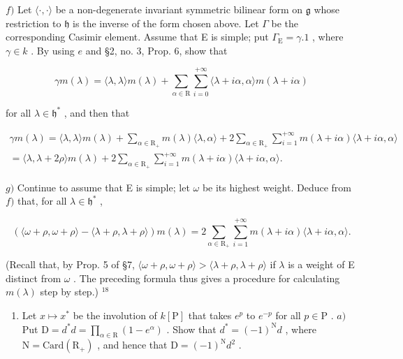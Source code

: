 \(f)\) Let \(\langle\cdot,\cdot\rangle\) be a non-degenerate invariant symmetric bilinear form on \(\mathfrak{g}\) whose restriction to \(\mathfrak{h}\) is the inverse of the form chosen above. Let \(\Gamma\) be the corresponding Casimir element. Assume that E is simple; put \(\Gamma_{\mathrm{E}}=\gamma.1\) , where \(\gamma\in k\) . By using \(e\) and §2, no. 3, Prop. 6, show that

\[
\gamma m (\lambda) = \langle \lambda , \lambda \rangle m (\lambda) + \sum_ {\alpha \in \mathrm{R}} \sum_ {i = 0} ^ {+ \infty} \langle \lambda + i \alpha , \alpha \rangle m (\lambda + i \alpha)
\]

for all \(\lambda \in \mathfrak{h}^*\) , and then that

\[
\begin{array}{l} \gamma m (\lambda) = \langle \lambda , \lambda \rangle m (\lambda) + \sum_ {\alpha \in \mathrm{R} _ {+}} m (\lambda) \langle \lambda , \alpha \rangle + 2 \sum_ {\alpha \in \mathrm{R} _ {+}} \sum_ {i = 1} ^ {+ \infty} m (\lambda + i \alpha) \langle \lambda + i \alpha , \alpha \rangle \\ = \langle \lambda , \lambda + 2 \rho \rangle m (\lambda) + 2 \sum_ {\alpha \in \mathrm{R} _ {+}} \sum_ {i = 1} ^ {+ \infty} m (\lambda + i \alpha) \langle \lambda + i \alpha , \alpha \rangle . \end{array}
\]

\(g)\) Continue to assume that E is simple; let \(\omega\) be its highest weight. Deduce from \(f)\) that, for all \(\lambda \in \mathfrak{h}^*\) ,

\[
(\langle \omega + \rho , \omega + \rho \rangle - \langle \lambda + \rho , \lambda + \rho \rangle) m (\lambda) = 2 \sum_ {\alpha \in \mathrm{R} _ {+}} \sum_ {i = 1} ^ {+ \infty} m (\lambda + i \alpha) \langle \lambda + i \alpha , \alpha \rangle .
\]

(Recall that, by Prop. 5 of §7, \(\langle\omega+\rho,\omega+\rho\rangle>\langle\lambda+\rho,\lambda+\rho\rangle\) if \(\lambda\) is a weight of E distinct from \(\omega\) . The preceding formula thus gives a procedure for calculating \(m(\lambda)\) step by step.) \(^{18}\)

\begin{enumerate}
\def\labelenumi{\arabic{enumi})}
\setcounter{enumi}{5}
\tightlist
\item
  Let \(x \mapsto x^*\) be the involution of \(k[\mathrm{P}]\) that takes \(e^p\) to \(e^{-p}\) for all \(p \in \mathrm{P}\) . \(a)\) Put \(\mathrm{D} = d^* d = \prod_{\alpha \in \mathrm{R}} (1 - e^\alpha)\) . Show that \(d^* = (-1)^{\mathrm{N}} d\) , where \(\mathrm{N} = \mathrm{Card}(\mathrm{R}_+)\) , and hence that \(\mathrm{D} = (-1)^{\mathrm{N}} d^2\) .
\end{enumerate}


